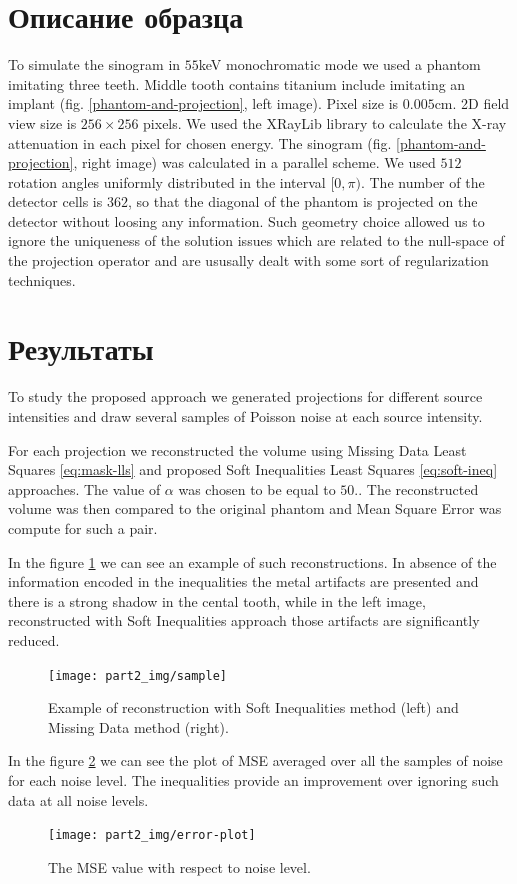 \section{Описание образца}
\label{s-phantom}
To simulate the sinogram in $55$keV monochromatic mode we used a phantom imitating three teeth. Middle tooth contains titanium include imitating an implant (fig. \ref{phantom-and-projection}, left image). Pixel size is $0.005$cm. 2D field view size is $256 \times 256$ pixels. We used the XRayLib library \cite{brunetti2004library, schoonjans2011xraylib} to calculate the X-ray attenuation in each pixel for chosen energy. The sinogram (fig. \ref{phantom-and-projection}, right image) was calculated in a parallel scheme. We used $512$ rotation angles uniformly distributed in the interval $[0, \pi)$. The number of the detector cells is $362$, so that the diagonal of the phantom is projected on the detector without loosing any information. Such geometry choice allowed us to ignore the uniqueness of the solution issues which are related to the null-space of the projection operator and are ususally dealt with some sort of regularization techniques.

\section{Результаты}
\label{s-results}
To study the proposed approach we generated projections for different source intensities and draw several samples of Poisson noise at each source intensity.

For each projection we reconstructed the volume using Missing Data Least Squares \eqref{eq:mask-lls} and proposed Soft Inequalities Least Squares \eqref{eq:soft-ineq} approaches. The value of $\alpha$ was chosen to be equal to $50$.. The reconstructed volume was then compared to the original phantom and Mean Square Error was compute for such a pair.

In the figure \ref{sample} we can see an example of such reconstructions. In absence of the information encoded in the inequalities the metal artifacts are presented and there is a strong shadow in the cental tooth, while in the left image, reconstructed with Soft Inequalities approach those artifacts are significantly reduced.
\begin{figure}
  \centering
  \texttt{[image: part2\_img/sample]}
  \caption{Example of reconstruction with Soft Inequalities method (left)
    and Missing Data method (right).}
  \label{sample}
\end{figure}
In the figure \ref{error-plot} we can see the plot of MSE averaged over all the samples of noise for each noise level. The inequalities provide an improvement over ignoring such data at all noise levels.
\begin{figure}
  \centering
  \texttt{[image: part2\_img/error-plot]}
  \caption{The MSE value with respect to noise level.}
  \label{error-plot}
\end{figure}

